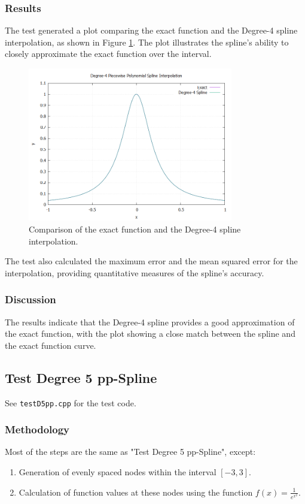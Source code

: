 \documentclass{article}
\begin{document}
\subsubsection{Results}
The test generated a plot comparing the exact function and the Degree-4 spline interpolation, as shown in Figure \ref{fig:spline_plot}. The plot illustrates the spline's ability to closely approximate the exact function over the interval.

\begin{figure}[H]
    \centering
    \includegraphics[width=0.8\textwidth]{../figure/degree4_spline_plot.png}
    \caption{Comparison of the exact function and the Degree-4 spline interpolation.}
    \label{fig:spline_plot}
\end{figure}

The test also calculated the maximum error and the mean squared error for the interpolation, providing quantitative measures of the spline's accuracy.

\subsubsection{Discussion}
The results indicate that the Degree-4 spline provides a good approximation of the exact function, with the plot showing a close match between the spline and the exact function curve.


\subsection{Test Degree 5 pp-Spline}
See \texttt{testD5pp.cpp} for the test code.
\subsubsection{Methodology}
Most of the steps are the same as "Test Degree 5 pp-Spline", except:
\begin{enumerate}
    \item Generation of evenly spaced nodes within the interval \([-3, 3]\).
    \item Calculation of function values at these nodes using the function \( f(x) = \frac{1}{e^{x^2}} \).
\end{enumerate}
\end{document}
